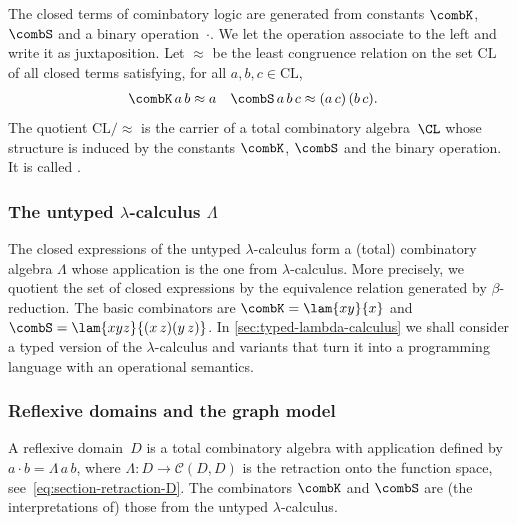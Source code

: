 The closed terms of cominbatory logic are generated from constants $\combK$, $\combS$ and a binary operation~$\cdot$.
We let the operation associate to the left and write it as juxtaposition.
%
Let $\approx$ be the least congruence relation
on the set $\mathrm{CL}$ of all closed terms satisfying, for all $a, b, c \in \mathrm{CL}$,
%
\begin{align*}
  \combK \, a \, b &\approx a
  &
  \combS \, a \, b \, c &\approx (a \, c) \, (b \, c).
\end{align*}
%
The quotient $\mathrm{CL}/{\approx}$ is the carrier of a total combinatory algebra~$\CL$ whose structure is induced by the constants $\combK$, $\combS$ and the binary operation. It is called .


\subsubsection[\texorpdfstring%
{The untyped $\lambda$-calculus $\Lambda$}%
{The untyped lambda-calculus Lambda}%
]{The untyped $\lambda$-calculus $\Lambda$}
\label{sec:lambda-calculus-pca}

The closed expressions of the untyped $\lambda$-calculus form a
(total) combinatory algebra $\Lambda$ whose application is the one from
$\lambda$-calculus. More precisely, we quotient the set of closed
expressions by the equivalence relation generated by
$\beta$-reduction. The basic combinators are $\combK = \lam{x y}{x}$
and $\combS = \lam{x y z}{(x \, z)(y \, z)}$.
%
In \cref{sec:typed-lambda-calculus} we shall consider a typed version of the $\lambda$-calculus and variants that turn it into a programming language with an operational semantics.


\subsubsection{Reflexive domains and the graph model}
\label{sec:reflexive-domain-pca}

A reflexive domain~$D$ is a total combinatory algebra with application defined by $a \cdot b = \Lambda \, a \, b$, where $\Lambda : D \to \mathcal{C}(D, D)$ is the
retraction onto the function space, see~\eqref{eq:section-retraction-D}. The combinators $\combK$ and $\combS$ are (the interpretations of) those from the untyped $\lambda$-calculus.

